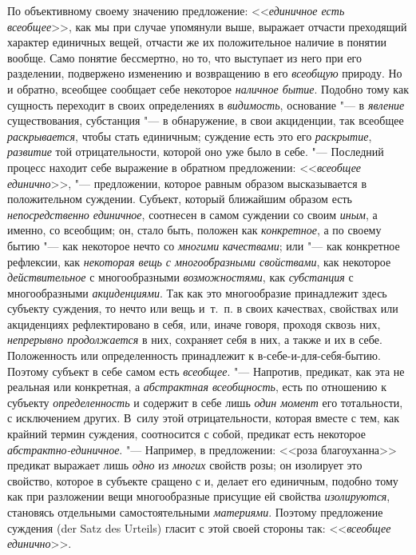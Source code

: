 {По объективному своему значению предложение:
<<{\em единичное есть всеобщее}>>,
как мы при случае упомянули выше, выражает отчасти преходящий
характер единичных вещей, отчасти же их положительное наличие в понятии
вообще. Само понятие бессмертно, но то, что выступает из него при его
разделении, подвержено изменению и возвращению в его
{\em всеобщую} природу.
Но и обратно, всеобщее сообщает себе некоторое
{\em наличное бытие}.
Подобно тому как сущность переходит в своих определениях в
{\em видимость},
основание "--- в
{\em явление}
существования, субстанция "--- в обнаружение, в
свои акциденции, так всеобщее
{\em раскрывается}, чтобы
стать единичным; суждение есть это его
{\em раскрытие},
{\em развитие} той
отрицательности, которой оно уже было в себе. "--- Последний
процесс находит себе выражение в обратном предложении:
<<{\em всеобщее единично}>>, "---
предложении, которое равным образом высказывается в
положительном суждении. Субъект, который ближайшим образом есть
{\em непосредственно единичное},
соотнесен в самом суждении со своим
{\em иным}, а именно,
со всеобщим; он, стало быть, положен как
{\em конкретное}, а по
своему бытию "--- как некоторое нечто со
{\em многими
}{\em качествами}; или
"--- как конкретное рефлексии, как
{\em некоторая вещь с многообразными
свойствами}, как некоторое
{\em действительное} с
многообразными {\em возможностями},
как {\em субстанция}
с многообразными
{\em акциденциями}. Так
как это многообразие принадлежит здесь субъекту суждения, то нечто или вещь
и~т.~п. в своих качествах, свойствах или акциденциях рефлектировано в себя,
или, иначе говоря, проходя сквозь них,
{\em непрерывно продолжается}
в них, сохраняет себя в них, а также и их в себе.
Положенность или определенность принадлежит к в-себе-и-для-себя-бытию.
Поэтому субъект в себе самом есть
{\em всеобщее}. "---
Напротив, предикат, как эта не реальная или конкретная, а
{\em абстрактная всеобщность},
есть по отношению к субъекту
{\em определенность} и
содержит в себе лишь {\em один момент}
его тотальности, с исключением других. В~силу этой
отрицательности, которая вместе с тем, как крайний термин суждения,
соотносится с собой, предикат есть некоторое
{\em абстрактно-единичное}. "---
Например, в предложении: <<роза благоуханна>> предикат выражает
лишь {\em одно} из
{\em многих} свойств
розы; он изолирует это свойство, которое в субъекте сращено с и,
делает его единичным, подобно тому как при разложении вещи многообразные
присущие ей свойства {\em изолируются},
становясь отдельными самостоятельными
{\em материями}.
Поэтому предложение суждения (der Satz des Urteils)
гласит с этой своей стороны так:
<<{\em всеобщее единично}>>.

}
